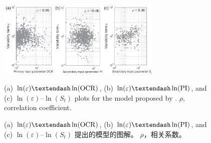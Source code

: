 \begin{figure}[!htb]
    \centering
    \includegraphics[width=0.7\textwidth]{figures/figure-16.png}
    \caption{(a) $\ln(\varepsilon)–\ln(\rm{OCR})$, (b) $\ln(\varepsilon)–\ln(\rm{PI})$, and (c) $\ln(\varepsilon)–\ln(S_t)$ plots for the model proposed by \citet{Jamiolkowski198557}. $\rho$, correlation coefficient.}
    \addtocounter{figure}{-1}
    \vspace{-5pt}
    \renewcommand{\figurename}{图}
    \caption{(a) $\ln(\varepsilon)–\ln(\rm{OCR})$, (b) $\ln(\varepsilon)–\ln(\rm{PI})$, and (c) $\ln(\varepsilon)–\ln(S_t)$ \citet{Jamiolkowski198557}提出的模型的图解。 $\rho$，相关系数。}
    \renewcommand{\figurename}{Figure}
    \label{figure:16}
\end{figure}